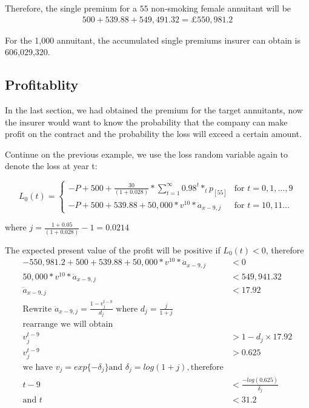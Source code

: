 \documentclass{report}
\begin{document}
Therefore, the single premium for a $55$ non-smoking female annuitant will be 
\begin{align}
500 + 539.88 +549,491.32= \pounds550,981.2 \nonumber
\end{align}

For the 1,000 annuitant, the accumulated single premiums insurer can obtain is 606,029,320.

\subsection{Profitablity}

In the last section, we had obtained the premium for the target annuitants, now the insurer would want to know the probability that the company can make profit on the contract and the probability the loss will exceed a certain amount.

Continue on the previous example, we use the loss random variable again to denote the loss at year t:

\[
 L_0(t) =
  \begin{cases}
   -P + 500 + \frac{30}{(1+0.028)} * \sum_{t=1}^{\infty} 0.98^t * _tp_{[55]} & \text{for } t= 0,1, \dots, 9 \\
   -P +500 +539.88 +  50,000*v^{10}*\ddot{a}_{x-9,j}  & \text{for }  t = 10, 11\dots
  \end{cases}
\]

where $j= \frac{1+0.05}{(1+0.028)}-1=0.0214$

The expected present value of the profit will be positive if $L_0(t) < 0$, therefore
 \begin{align*}
   -550,981.2 +500+ 539.88 + 50,000*v^{10}*\ddot{a}_{x-9,j}  &< 0 \\
   50,000*v^{10}*\ddot{a}_{x-9,j} &< 549,941.32 \\
   \ddot{a}_{x-9,j} &< 17.92 \\
\text{Rewrite } \ddot{a}_{x-9,j} = \frac{1-v^{t-9}_j}{d_j} \text{ where } d_j =\frac{j}{1+j}\\
\text{rearrange we will obtain}\\
v^{t-9}_j &> 1-d_j\times 17.92\\
v^{t-9}_j &> 0.625\\
\text{we have } v_j = exp\{-\delta_j\} \text{and } \delta_j =log(1+j),\text{therefore}\\
t-9&< \frac{-log(0.625)}{\delta_j}\\
\text{and } t &< 31.2
\end{align*}
\end{document}
